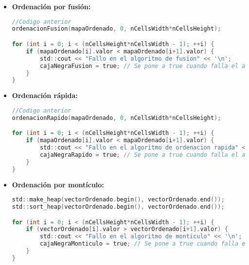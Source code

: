 \begin{itemize}
\item \textbf{Ordenación por fusión:}
\begin{lstlisting}[language=C]
//Codigo anterior
ordenacionFusion(mapaOrdenado, 0, nCellsWidth*nCellsHeight);

for (int i = 0; i < (nCellsHeight*nCellsWidth - 1); ++i) {
    if (mapaOrdenado[i].valor < mapaOrdenado[i+1].valor) {
        std::cout << "Fallo en el algoritmo de fusion" << '\n';
        cajaNegraFusion = true; // Se pone a true cuando falla el algoritmo
    }
}
\end{lstlisting}
\item \textbf{Ordenación rápida:}
\begin{lstlisting}[language=C]
//Codigo anterior
ordenacionRapido(mapaOrdenado, 0, nCellsWidth*nCellsHeight);

for (int i = 0; i < (nCellsHeight*nCellsWidth - 1); ++i) {
    if (mapaOrdenado[i].valor < mapaOrdenado[i+1].valor) {
        std::cout << "Fallo en el algoritmo de ordenacion rapida" << '\n';
        cajaNegraRapido = true; // Se pone a true cuando falla el algoritmo
    }
}
\end{lstlisting}
\item \textbf{Ordenación por montículo:}
\begin{lstlisting}[language=C]
std::make_heap(vectorOrdenado.begin(), vectorOrdenado.end());
std::sort_heap(vectorOrdenado.begin(), vectorOrdenado.end());

for (int i = 0; i < (nCellsHeight*nCellsWidth - 1); ++i) {
    if (vectorOrdenado[i].valor > vectorOrdenado[i+1].valor) {
        std::cout << "Fallo en el algoritmo de monticulo" << '\n';
        cajaNegraMonticulo = true; // Se pone a true cuando falla el algoritmo
    }
}
\end{lstlisting}
\end{itemize}
